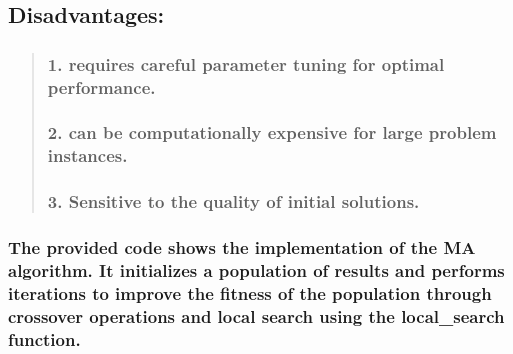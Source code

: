\documentclass[11pt]{article}
\begin{document}
\hypertarget{disadvantages}{%
\subsection{\texorpdfstring{
Disadvantages:}{  Disadvantages:}}\label{disadvantages}}

\begin{quote}
\hypertarget{requires-careful-parameter-tuning-for-optimal-performance.}{%
\subsubsection{\texorpdfstring{ 1. requires careful parameter tuning for
optimal
performance.}{  1. requires careful parameter tuning for optimal performance.}}\label{requires-careful-parameter-tuning-for-optimal-performance.}}

\hypertarget{can-be-computationally-expensive-for-large-problem-instances.}{%
\subsubsection{\texorpdfstring{ 2. can be computationally expensive for
large problem
instances.}{  2. can be computationally expensive for large problem instances.}}\label{can-be-computationally-expensive-for-large-problem-instances.}}

\hypertarget{sensitive-to-the-quality-of-initial-solutions.}{%
\subsubsection{\texorpdfstring{ 3. Sensitive to the quality of initial
solutions.}{  3. Sensitive to the quality of initial solutions.}}\label{sensitive-to-the-quality-of-initial-solutions.}}
\end{quote}

\hypertarget{the-provided-code-shows-the-implementation-of-the-ma-algorithm.-it-initializes-a-population-of-results-and-performs-iterations-to-improve-the-fitness-of-the-population-through-crossover-operations-and-local-search-using-the-local_search-function.}{%
\subsubsection{\texorpdfstring{ The provided code shows the
implementation of the MA algorithm. It initializes a population of
results and performs iterations to improve the fitness of the population
through crossover operations and local search using the local\_search
function.}{  The provided code shows the implementation of the MA algorithm. It initializes a population of results and performs iterations to improve the fitness of the population through crossover operations and local search using the local\_search function.}}\label{the-provided-code-shows-the-implementation-of-the-ma-algorithm.-it-initializes-a-population-of-results-and-performs-iterations-to-improve-the-fitness-of-the-population-through-crossover-operations-and-local-search-using-the-local_search-function.}}
\end{document}
